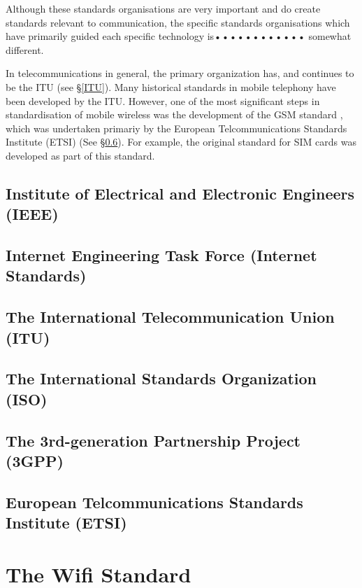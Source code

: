 Although these standards organisations are very important and 
do create standards relevant to communication, the specific standards
organisations which have primarily guided each specific technology is••••••••••••
somewhat different.

In telecommunications in general, the primary organization has, and continues
to be the ITU (see \S\ref{ITU}). Many historical standards in mobile
telephony have been developed by the ITU. However, one of the most significant
steps in standardisation of mobile wireless was the
development of the GSM standard \cite{GSM}, which was undertaken primariy by the
European Telcommunications Standards Institute (ETSI) (See \S\ref{ETSI}).
For example, the original standard for SIM cards was developed as part of
this standard.




\subsection{Institute of Electrical and Electronic Engineers (IEEE)}

\subsection{Internet Engineering Task Force (Internet Standards)}

\subsection{The International Telecommunication Union (ITU)}\label{ITU}

\subsection{The International Standards Organization (ISO)}

\subsection{The 3rd-generation Partnership Project (3GPP)}

\subsection{European Telcommunications Standards Institute (ETSI)}\label{ETSI}

\section{The Wifi Standard}

